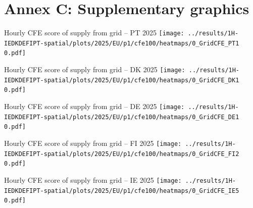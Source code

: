 
\section{Annex C: Supplementary graphics}



\begin{frame}{Hourly CFE score of supply from grid -- PT 2025}
  \vspace{.5cm}
  \texttt{[image: ../results/1H-IEDKDEFIPT-spatial/plots/2025/EU/p1/cfe100/heatmaps/0\_GridCFE\_PT1 0.pdf]}
\end{frame}

\begin{frame}{Hourly CFE score of supply from grid -- DK 2025}
  \vspace{.5cm}
  \texttt{[image: ../results/1H-IEDKDEFIPT-spatial/plots/2025/EU/p1/cfe100/heatmaps/0\_GridCFE\_DK1 0.pdf]}
\end{frame}

\begin{frame}{Hourly CFE score of supply from grid -- DE 2025}
  \vspace{.5cm}
  \texttt{[image: ../results/1H-IEDKDEFIPT-spatial/plots/2025/EU/p1/cfe100/heatmaps/0\_GridCFE\_DE1 0.pdf]}
\end{frame}

\begin{frame}{Hourly CFE score of supply from grid -- FI 2025}
  \vspace{.5cm}
  \texttt{[image: ../results/1H-IEDKDEFIPT-spatial/plots/2025/EU/p1/cfe100/heatmaps/0\_GridCFE\_FI2 0.pdf]}
\end{frame}

\begin{frame}{Hourly CFE score of supply from grid -- IE 2025}
  \vspace{.5cm}
  \texttt{[image: ../results/1H-IEDKDEFIPT-spatial/plots/2025/EU/p1/cfe100/heatmaps/0\_GridCFE\_IE5 0.pdf]}
\end{frame}


